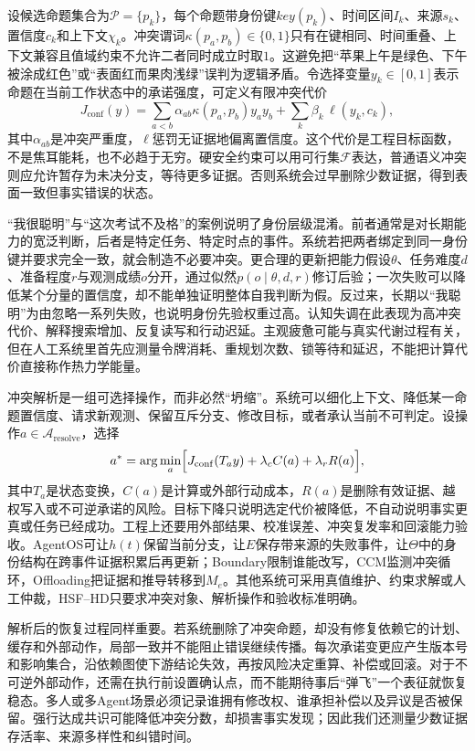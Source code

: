设候选命题集合为$\mathcal P=\{p_k\}$，每个命题带身份键$key(p_k)$、时间区间$I_k$、来源$s_k$、置信度$c_k$和上下文$\chi_k$。冲突谓词$\kappa(p_a,p_b)\in\{0,1\}$只有在键相同、时间重叠、上下文兼容且值域约束不允许二者同时成立时取$1$。这避免把“苹果上午是绿色、下午被涂成红色”或“表面红而果肉浅绿”误判为逻辑矛盾。令选择变量$y_k\in[0,1]$表示命题在当前工作状态中的承诺强度，可定义有限冲突代价
\begin{equation}
J_{\mathrm{conf}}(y)=\sum_{a<b}\alpha_{ab}\kappa(p_a,p_b)y_ay_b
+\sum_k\beta_k\,\ell(y_k,c_k),
\end{equation}
其中$\alpha_{ab}$是冲突严重度，$\ell$惩罚无证据地偏离置信度。这个代价是工程目标函数，不是焦耳能耗，也不必趋于无穷。硬安全约束可以用可行集$\mathcal F$表达，普通语义冲突则应允许暂存为未决分支，等待更多证据。否则系统会过早删除少数证据，得到表面一致但事实错误的状态。

“我很聪明”与“这次考试不及格”的案例说明了身份层级混淆。前者通常是对长期能力的宽泛判断，后者是特定任务、特定时点的事件。系统若把两者绑定到同一身份键并要求完全一致，就会制造不必要冲突。更合理的更新把能力假设$\theta$、任务难度$d$、准备程度$r$与观测成绩$o$分开，通过似然$p(o\mid\theta,d,r)$修订后验；一次失败可以降低某个分量的置信度，却不能单独证明整体自我判断为假。反过来，长期以“我聪明”为由忽略一系列失败，也说明身份先验权重过高。认知失调在此表现为高冲突代价、解释搜索增加、反复读写和行动迟延。主观疲惫可能与真实代谢过程有关，但在人工系统里首先应测量令牌消耗、重规划次数、锁等待和延迟，不能把计算代价直接称作热力学能量。

冲突解析是一组可选择操作，而非必然“坍缩”。系统可以细化上下文、降低某一命题置信度、请求新观测、保留互斥分支、修改目标，或者承认当前不可判定。设操作$a\in\mathcal A_{\mathrm{resolve}}$，选择
\begin{equation}
a^*=\arg\min_a\Bigl[J_{\mathrm{conf}}(T_a y)+\lambda_c C(a)+\lambda_r R(a)\Bigr],
\end{equation}
其中$T_a$是状态变换，$C(a)$是计算或外部行动成本，$R(a)$是删除有效证据、越权写入或不可逆承诺的风险。目标下降只说明选定代价被降低，不自动说明事实更真或任务已经成功。工程上还要用外部结果、校准误差、冲突复发率和回滚能力验收。AgentOS可让$h(t)$保留当前分支，让$E$保存带来源的失败事件，让$\Theta$中的身份结构在跨事件证据积累后再更新；Boundary限制谁能改写，CCM监测冲突循环，Offloading把证据和推导转移到$M_e$。其他系统可采用真值维护、约束求解或人工仲裁，HSF--HD只要求冲突对象、解析操作和验收标准明确。

解析后的恢复过程同样重要。若系统删除了冲突命题，却没有修复依赖它的计划、缓存和外部动作，局部一致并不能阻止错误继续传播。每次承诺变更应产生版本号和影响集合，沿依赖图使下游结论失效，再按风险决定重算、补偿或回滚。对于不可逆外部动作，还需在执行前设置确认点，而不能期待事后“弹飞”一个表征就恢复稳态。多人或多Agent场景必须记录谁拥有修改权、谁承担补偿以及异议是否被保留。强行达成共识可能降低冲突分数，却损害事实发现；因此我们还测量少数证据存活率、来源多样性和纠错时间。

